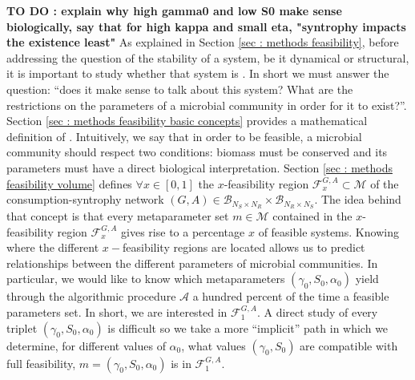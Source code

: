 \documentclass[12pt, titlepage]{report}
\begin{document}
\textbf{TO DO : explain why high gamma0 and low S0 make sense biologically, say that for high kappa and small eta, "syntrophy impacts the existence least"}
As explained in Section \ref{sec : methods feasibility}, before addressing the question of the stability of a system, be it dynamical or structural, it is important to study whether that system is . In short we must answer the question: ``does it make sense to talk about this system? What are the restrictions on the parameters of a microbial community in order for it to exist?''.
 Section \ref{sec : methods feasibility basic concepts} provides a mathematical definition of . Intuitively, we say that in order to be feasible, a microbial community should respect two conditions: biomass must be conserved and its parameters must have a direct biological interpretation. Section \ref{sec : methods feasibility volume} defines $\forall x \in [0,1]$ the $x$-feasibility region $\mathcal{F}^{G,A}_x \subset \mathcal{M}$ of the consumption-syntrophy network $(G, A) \in \mathcal{B}_{N_S \times N_R} \times  \mathcal{B}_{N_R \times N_S}$. The idea behind that concept is that every metaparameter set $m \in \mathcal{M}$ contained in the $x$-feasibility region $\mathcal{F}^{G,A}_x$ gives rise to a percentage $x$ of feasible systems. Knowing where the different $x-$feasibility regions are located allows us to predict relationships between the different parameters of microbial communities. In particular, we would like to know which metaparameters $(\gamma_0, S_0, \alpha_0)$ yield through the algorithmic procedure $\mathcal{A}$ a hundred percent of the time a feasible parameters set. In short, we are interested in $\mathcal{F}^{G,A}_1$. A direct study of every triplet $(\gamma_0, S_0, \alpha_0)$ is difficult so we take a more ``implicit'' path in which we  determine, for different values of $\alpha_0$, what values $(\gamma_0, S_0)$ are compatible with full feasibility, \ie $m=(\gamma_0, S_0, \alpha_0)$ is in $\mathcal{F}^{G,A}_1$.
\end{document}
